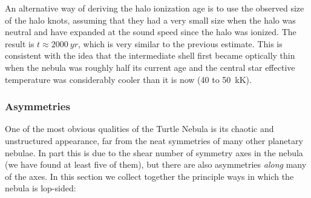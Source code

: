 \documentclass[useAMS, usenatbib]{mnras}
\begin{document}
An alternative way of deriving the halo ionization age is to use the observed size of the halo knots,
assuming that they had a very small size when the halo was neutral and have expanded at the sound speed since the halo was ionized.
The result is \(t \approx \SI{2000}{yr}\), which is very similar to the previous estimate. 
This is consistent with the idea that the intermediate shell first became optically thin when the nebula was roughly half its current age and the central star effective temperature was considerably cooler than it is now (\num{40} to \SI{50}{kK}).


\subsubsection{Asymmetries}
\label{sec:asymmetries}
One of the most obvious qualities of the Turtle Nebula is its chaotic and unstructured appearance,
far from the neat symmetries of many other planetary nebulae.
In part this is due to the shear number of symmetry axes in the nebula
(we have found at least five of them),
but there are also asymmetries \emph{along} many of the axes.
In this section we collect together the principle ways in which the nebula is lop-sided:
\end{document}
